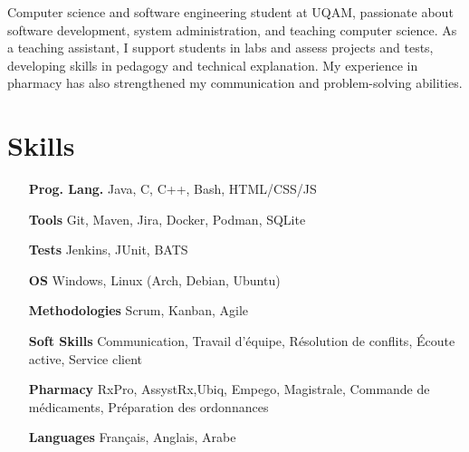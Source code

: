 \documentclass[letterpaper,10pt]{article}
\begin{document}


  Computer science and software engineering student at UQAM, passionate about software development, system administration, and teaching computer science. As a teaching assistant, I support students in labs and assess projects and tests, developing skills in pedagogy and technical explanation. My experience in pharmacy has also strengthened my communication and problem-solving abilities.

  \section{Skills}

  \begin{multicols}{2}
    \begin{itemize}[itemsep=-2px, parsep=5pt, leftmargin=75pt]
      \item[\textbf{Prog. Lang.}] Java, C, C++, Bash, HTML/CSS/JS
      \item[\textbf{Tools}] Git, Maven, Jira, Docker, Podman, SQLite
      \item[\textbf{Tests}] Jenkins, JUnit, BATS
      \item[\textbf{OS}]  Windows, Linux (Arch, Debian, Ubuntu)
      \item[\textbf{Methodologies}]  Scrum, Kanban, Agile
      \item[\textbf{Soft Skills}]  Communication, Travail d'équipe, Résolution de conflits, Écoute active, Service client
      \item[\textbf{Pharmacy}]  RxPro, AssystRx,Ubiq, Empego, Magistrale, Commande de médicaments, Préparation des ordonnances
      \item[\textbf{Languages}]  Français, Anglais, Arabe
    \end{itemize}
  \end{multicols}
\end{document}
